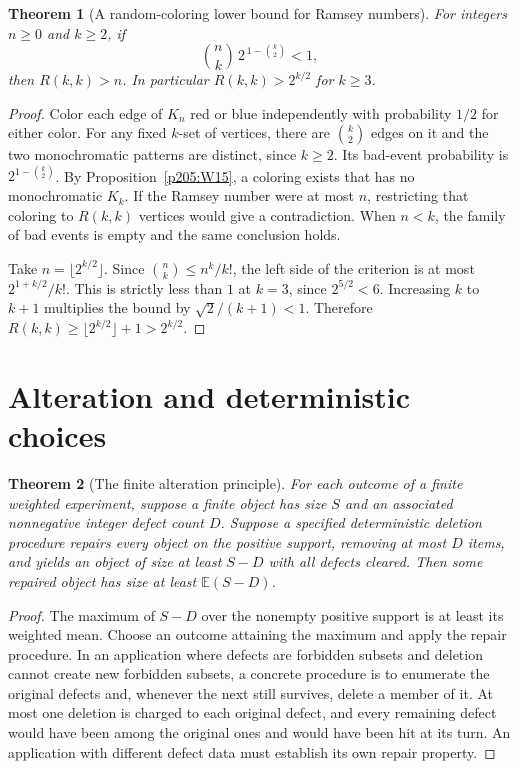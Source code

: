 \documentclass[11pt,oneside,openany]{book}
\theoremstyle{plain}
\newtheorem{theorem}{Theorem}[chapter]
\theoremstyle{definition}
\theoremstyle{remark}
\begin{document}
\begin{theorem}[A random-coloring lower bound for Ramsey numbers]
\label{p205:W16}
For integers \(n\ge 0\) and \(k\ge 2\), if
\[
  \binom nk\,2^{\,1-\binom k2}<1,
\]
then \(R(k,k)>n\). In particular \(R(k,k)>2^{k/2}\) for \(k\ge3\).
\end{theorem}

\begin{proof}
Color each edge of \(K_n\) red or blue independently with probability
\(1/2\) for either color. For any fixed \(k\)-set of vertices, there are
\(\binom k2\) edges on it and the two monochromatic patterns are
distinct, since \(k\ge2\). Its bad-event probability is
\(2^{1-\binom k2}\). By Proposition~\ref{p205:W15}, a coloring exists
that has no monochromatic \(K_k\). If the Ramsey number were at most
\(n\), restricting that coloring to \(R(k,k)\) vertices would give a
contradiction. When \(n<k\), the family of bad events is empty and the
same conclusion holds.

Take \(n=\lfloor 2^{k/2}\rfloor\). Since \(\binom nk\le n^k/k!\), the
left side of the criterion is at most \(2^{1+k/2}/k!\). This is strictly
less than \(1\) at \(k=3\), since \(2^{5/2}<6\). Increasing \(k\) to
\(k+1\) multiplies the bound by \(\sqrt{2}/(k+1)<1\). Therefore
\(R(k,k)\ge \lfloor 2^{k/2}\rfloor+1>2^{k/2}\).
\end{proof}

\section{Alteration and deterministic choices}

\begin{theorem}[The finite alteration principle]
\label{p205:W17}
For each outcome of a finite weighted experiment, suppose a finite
object has size \(S\) and an associated nonnegative integer defect
count \(D\). Suppose a specified deterministic deletion procedure
repairs every object on the positive support, removing at most \(D\)
items, and yields an object of size at least \(S-D\) with all defects
cleared. Then some repaired object has size at least
\(\mathbb E(S-D)\).
\end{theorem}

\begin{proof}
The maximum of \(S-D\) over the nonempty positive support is at least
its weighted mean. Choose an outcome attaining the maximum and apply
the repair procedure. In an application where defects are forbidden
subsets and deletion cannot create new forbidden subsets, a concrete
procedure is to enumerate the original defects and, whenever the
next still survives, delete a member of it. At most one deletion is
charged to each original defect, and every remaining defect would
have been among the original ones and would have been hit at its
turn. An application with different defect data must establish its
own repair property.
\end{proof}
\end{document}
